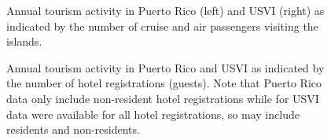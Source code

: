\documentclass[
  letterpaper,
  oneside,
  open=any]{scrbook}
\begin{document}
\begin{figure}


\caption{\label{fig-tourist}Annual tourism activity in Puerto Rico
(left) and USVI (right) as indicated by the number of cruise and air
passengers visiting the islands.}

\end{figure}%

\begin{figure}


\caption{\label{fig-hotel}Annual tourism activity in Puerto Rico and
USVI as indicated by the number of hotel registrations (guests). Note
that Puerto Rico data only include non-resident hotel registrations
while for USVI data were available for all hotel registrations, so may
include residents and non-residents.}

\end{figure}%
\end{document}
